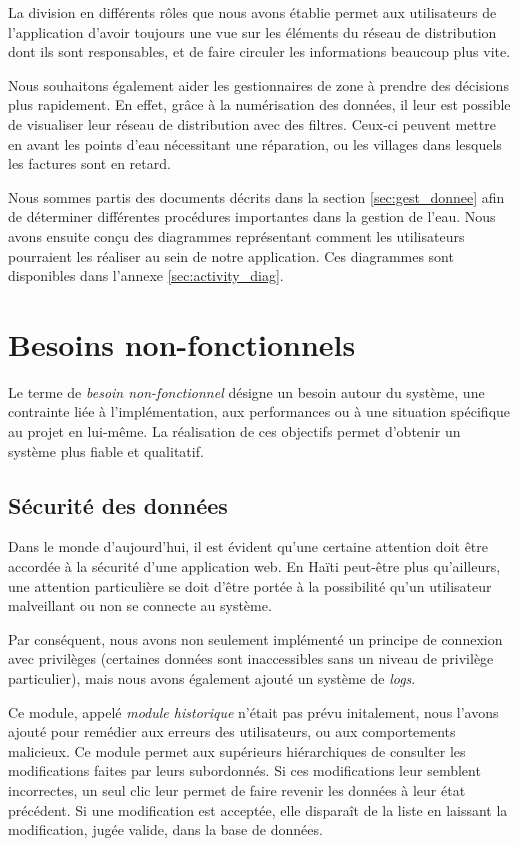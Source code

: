 \documentclass{EPL-master-thesis-covers-FR}
\begin{document}
				La division en différents rôles que nous avons établie permet aux utilisateurs de l'application d'avoir toujours une vue sur les éléments du réseau de distribution dont ils sont responsables, et de faire circuler les informations beaucoup plus vite.

				Nous souhaitons également aider les gestionnaires de zone à prendre des décisions plus rapidement. En effet, grâce à la numérisation des données, il leur est possible de visualiser leur réseau de distribution avec des filtres. Ceux-ci peuvent mettre en avant les points d'eau nécessitant une réparation, ou les villages dans lesquels les factures sont en retard.

				Nous sommes partis des documents décrits dans la section \ref{sec:gest_donnee} afin de déterminer différentes procédures importantes dans la gestion de l'eau. Nous avons ensuite conçu des diagrammes représentant comment les utilisateurs pourraient les réaliser au sein de notre application. Ces diagrammes sont disponibles dans l'annexe \ref{sec:activity_diag}.


		\section{Besoins non-fonctionnels}

			Le terme de \emph{besoin non-fonctionnel} désigne un besoin autour du système, une contrainte liée à l'implémentation, aux performances ou à une situation spécifique au projet en lui-même. La réalisation de ces objectifs permet d'obtenir un système plus fiable et qualitatif.

			\subsection*{Sécurité des données}
				Dans le monde d'aujourd'hui, il est évident qu'une certaine attention doit être accordée à la sécurité d'une application web. En Haïti peut-être plus qu'ailleurs, une attention particulière se doit d'être portée à la possibilité qu'un utilisateur malveillant ou non se connecte au système.

				Par conséquent, nous avons non seulement implémenté un principe de connexion avec privilèges (certaines données sont inaccessibles sans un niveau de privilège particulier), mais nous avons également ajouté un système de \emph{logs}.

				Ce module, appelé \emph{module historique} n'était pas prévu initalement, nous l'avons ajouté pour remédier aux erreurs des utilisateurs, ou aux comportements malicieux. Ce module permet aux supérieurs hiérarchiques de consulter les modifications faites par leurs subordonnés. Si ces modifications leur semblent incorrectes, un seul clic leur permet de faire revenir les données à leur état précédent. Si une modification est acceptée, elle disparaît de la liste en laissant la modification, jugée valide, dans la base de données.
\end{document}
